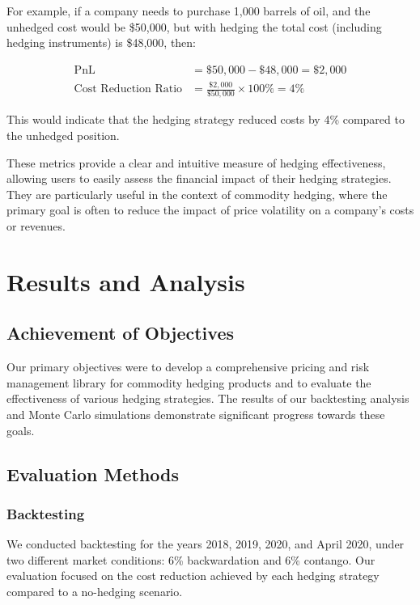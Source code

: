 \documentclass[12pt]{article}
\begin{document}
For example, if a company needs to purchase 1,000 barrels of oil, and the unhedged cost would be \$50,000, but with hedging the total cost (including hedging instruments) is \$48,000, then:

\begin{align*}
    \text{PnL} &= \$50,000 - \$48,000 = \$2,000 \\
    \text{Cost Reduction Ratio} &= \frac{\$2,000}{\$50,000} \times 100\% = 4\%
\end{align*}

This would indicate that the hedging strategy reduced costs by 4\% compared to the unhedged position.

These metrics provide a clear and intuitive measure of hedging effectiveness, allowing users to easily assess the financial impact of their hedging strategies. They are particularly useful in the context of commodity hedging, where the primary goal is often to reduce the impact of price volatility on a company's costs or revenues.

\section{Results and Analysis}

\subsection{Achievement of Objectives}

Our primary objectives were to develop a comprehensive pricing and risk management library for commodity hedging products and to evaluate the effectiveness of various hedging strategies. The results of our backtesting analysis and Monte Carlo simulations demonstrate significant progress towards these goals.

\subsection{Evaluation Methods}

\subsubsection{Backtesting}
We conducted backtesting for the years 2018, 2019, 2020, and April 2020, under two different market conditions: 6\% backwardation and 6\% contango. Our evaluation focused on the cost reduction achieved by each hedging strategy compared to a no-hedging scenario.
\end{document}
